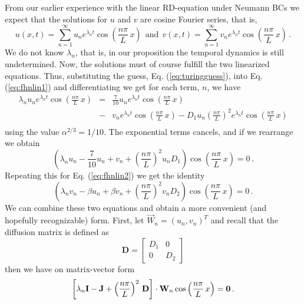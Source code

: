 From our earlier experience with the linear RD-equation under Neumann BCs 
we expect that the solutions for $u$ and $v$ are cosine Fourier series, that is,
\begin{equation}
\label{eq:turingguess}
	u(x,t) = \sum_{n=1}^\infty u_n e^{\lambda_n t}\cos\left(\frac{n\pi}{L} \, x\right) \ \ \text{and} 
	\ \ v(x,t) = \sum_{n=1}^\infty v_n e^{\lambda_n t}\cos\left(\frac{n\pi}{L} \, x\right) \, . 
\end{equation}
We do not know $\lambda_n$, that is, in our proposition the temporal dynamics is still undetermined. 
Now, the solutions must of course fulfill the two linearized equations. Thus, 
substituting the guess, Eq. (\ref{eq:turingguess}), into Eq. (\ref{eq:fhnlin1}) and differentiating we get
for each term, $n$, we have
\begin{eqnarray}
	\lambda_n u_n e^{\lambda_n t} \cos\left(\frac{n\pi}{L} \, x\right) 
	&=& \frac{7}{10}u_n e^{\lambda_n t} \cos\left(\frac{n\pi}{L} \, x\right)  \nonumber \\
	&-& v_n e^{\lambda_n t} \cos\left(\frac{n\pi}{L} \, x\right) 
	- D_1 u_n \left(\frac{n\pi}{L}\right)^2 e^{\lambda_n t} \cos\left(\frac{n\pi}{L} \, x\right)
	\nonumber \\
\end{eqnarray}
using the value $\alpha^{2/3}=1/10$. The exponential terms cancels, and if we rearrange we obtain
\begin{equation}
	\left(
		\lambda_n u_n -\frac{7}{10} u_n + v_n + \left(\frac{n\pi}{L}\right)^2 u_n D_1
	\right) \cos\left(\frac{n\pi}{L} \, x\right) = 0 \, . 
\end{equation}
Repeating this for Eq. (\ref{eq:fhnlin2}) we get the identity 
\begin{equation}
	\left( \lambda_n v_n - \beta u_n + \beta v_n + \left(\frac{n\pi}{L}\right)^2 v_n D_2
	\right) \cos\left(\frac{n\pi}{L} \, x\right) = 0 \, .
\end{equation}
We can combine these two equations and obtain a more convenient (and hopefully recognizable) form. 
First, let $\vec{W}_n = (u_n, v_n)^T$ and recall that the 
diffusion matrix is defined as
\begin{equation}
	\mathbf{D} =
	\begin{bmatrix}
	D_1 & 0 \\
	0 & D_2
	\end{bmatrix}
\end{equation}
then we have on matrix-vector form
\begin{equation}
	\left[
		\lambda_n \mathbf{I} - \mathbf{J} + \left(\frac{n\pi}{L}\right)^2 \, \mathbf{D}
	\right] \cdot \mathbf{W}_n \cos\left(\frac{n\pi}{L} \, x\right) = \mathbf{0} \, .
\end{equation}
